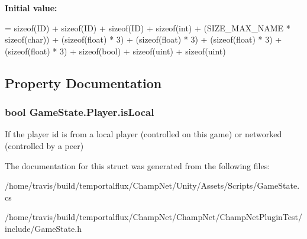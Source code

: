 {\bfseries Initial value\-:}
\begin{DoxyCode}
=
            \textcolor{keyword}{sizeof}(ID) 
            + \textcolor{keyword}{sizeof}(ID) 
            + \textcolor{keyword}{sizeof}(ID) 
            + \textcolor{keyword}{sizeof}(\textcolor{keywordtype}{int}) + (SIZE\_MAX\_NAME * \textcolor{keyword}{sizeof}(char))
            + (\textcolor{keyword}{sizeof}(float) * 3) 
            + (\textcolor{keyword}{sizeof}(float) * 3) 
            + (\textcolor{keyword}{sizeof}(float) * 3) 
            + (\textcolor{keyword}{sizeof}(float) * 3) 
            + \textcolor{keyword}{sizeof}(bool) 
            + \textcolor{keyword}{sizeof}(uint) 
            + \textcolor{keyword}{sizeof}(uint)
\end{DoxyCode}


\subsection{Property Documentation}
\hypertarget{struct_game_state_1_1_player_affd7c601a6d763dafdc59a58c415e9e7}{
\subsubsection[{is\-Local}]{\setlength{\rightskip}{0pt plus 5cm}bool Game\-State.\-Player.\-is\-Local\hspace{0.3cm}{\ttfamily [get]}}}\label{struct_game_state_1_1_player_affd7c601a6d763dafdc59a58c415e9e7}


If the player id is from a local player (controlled on this game) or networked (controlled by a peer) 



The documentation for this struct was generated from the following files\-:\begin{DoxyCompactItemize}
\item 
/home/travis/build/temportalflux/\-Champ\-Net/\-Unity/\-Assets/\-Scripts/Game\-State.\-cs\item 
/home/travis/build/temportalflux/\-Champ\-Net/\-Champ\-Net/\-Champ\-Net\-Plugin\-Test/include/Game\-State.\-h\end{DoxyCompactItemize}
